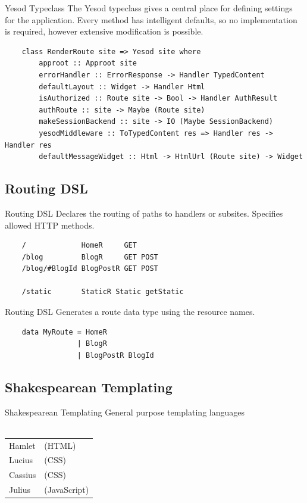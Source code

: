 \documentclass[pdf]{beamer}
\begin{document}
\begin{frame}[fragile]{Yesod Typeclass}
  The Yesod typeclass gives a central place for defining settings for
  the application. Every method has intelligent defaults, so no
  implementation is required, however extensive modification is
  possible.

  \begin{verbatim}
    class RenderRoute site => Yesod site where
        approot :: Approot site
        errorHandler :: ErrorResponse -> Handler TypedContent
        defaultLayout :: Widget -> Handler Html
        isAuthorized :: Route site -> Bool -> Handler AuthResult
        authRoute :: site -> Maybe (Route site)
        makeSessionBackend :: site -> IO (Maybe SessionBackend)
        yesodMiddleware :: ToTypedContent res => Handler res -> Handler res
        defaultMessageWidget :: Html -> HtmlUrl (Route site) -> Widget
  \end{verbatim}
\end{frame}

\subsection{Routing DSL}
\begin{frame}[fragile]{Routing DSL}
  Declares the routing of paths to handlers or subsites. Specifies
  allowed HTTP methods.

  \begin{verbatim}
    /             HomeR     GET
    /blog         BlogR     GET POST
    /blog/#BlogId BlogPostR GET POST

    /static       StaticR Static getStatic
  \end{verbatim}
\end{frame}

\begin{frame}[fragile]{Routing DSL}
  Generates a route data type using the resource names.
  \begin{verbatim}
    data MyRoute = HomeR
                 | BlogR
                 | BlogPostR BlogId
  \end{verbatim}
\end{frame}

\subsection{Shakespearean Templating}
\begin{frame}{Shakespearean Templating}
  General purpose templating languages\\
  \\
  \begin{tabular}{ l l }
    Hamlet  & (HTML)\\
    Lucius  & (CSS)\\
    Cassius & (CSS)\\
    Julius  & (JavaScript)\\
  \end{tabular}
\end{frame}
\end{document}
